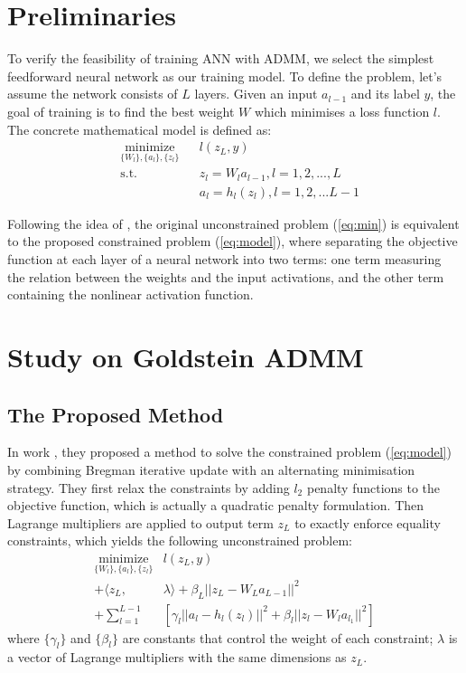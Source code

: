\documentclass[letterpaper, 10 pt, conference]{ieeeconf}  %
\begin{document}
\section{Preliminaries}\label{preliminaries}
To verify the feasibility of training ANN with ADMM, we select the simplest feedforward neural network as our training model. To define the problem, let's assume the network consists of $L$ layers. Given an input $a_{l-1}$ and its label $y$, the goal of training is to find the best weight $W$ which minimises a loss function $l$. The concrete mathematical model is defined as: 
\begin{equation}
\begin{aligned} 
& \underset{\{W_l\},\{a_l\}, \{z_l\}}{\text{minimize}}
& & l(z_L,y) \\
& \text{s.t.}
& & z_l = W_la_{l-1},  l = 1,2,...,L \\
& & & a_l = h_l(z_l),  l = 1,2,...L-1 \label{eq:model}
\end{aligned}
\end{equation}

Following the idea of \cite{9}, the original unconstrained problem (\ref{eq:min}) is equivalent to the proposed constrained problem (\ref{eq:model}), where separating the objective function at each layer of a neural network into two terms: one term measuring the relation between the weights and the input activations, and the other term containing the nonlinear activation function. 



\section{Study on Goldstein ADMM} \label{studycase}
\subsection{The Proposed Method} \label{method}
In work \cite{9}, they proposed a method to solve the constrained problem (\ref{eq:model}) by combining Bregman iterative update with an alternating minimisation strategy. They first relax the constraints by adding $l_2$ penalty functions to the objective function, which is actually a quadratic penalty formulation. Then  Lagrange multipliers are applied to output term $z_L$ to exactly enforce equality constraints, which yields the following unconstrained problem: \\
\begin{equation}
\begin{aligned}
\underset{\{W_l\},\{a_l\}, \{z_l\}}{\text{minimize}} & l(z_L,y) \\
+  \langle z_L, &\lambda \rangle + \beta_L||z_L -W_La_{L-1}||^2 \\
+ \sum_{l=1}^{L-1}&[\gamma_l||a_l - h_l(z_l)||^2 + \beta_l||z_l - W_la_{l_1}||^2]
\label{eq:breg_model}
\end{aligned}
\end{equation}
where $\{\gamma_l \}$ and $\{\beta_l\}$ are constants that control the weight of each constraint; $\lambda$ is a vector of Lagrange multipliers with the same dimensions as $z_L$. 
\end{document}
